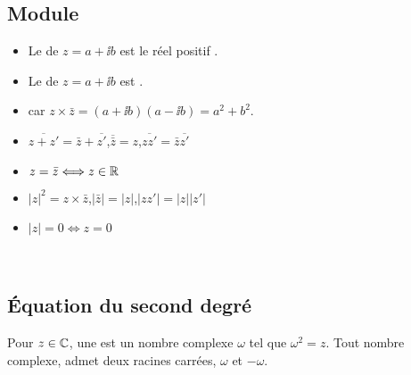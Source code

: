 \documentclass[10pt,class=article,crop=false]{standalone}
\begin{document}
\begin{multicols}{2}
\subsection{Module}


\begin{itemize}
	\item Le  de $z = a + \ii b$ est le réel positif .
	\item Le  de $z = a + \ii b$ est .
	\item {} car $z \times \bar z = (a+\ii b)(a-\ii b) = a^2+b^2$.
\end{itemize}


\begin{itemize}
	\item $\overline{z + z'} = \bar{z} + \overline{z'}$,\quad $\overline{\bar{z}} =
	z$,\quad $\overline{zz'} = \bar{z}  \overline{z'}$
	
	\item $z = \bar{z} \Longleftrightarrow z \in \mathbb{R}$
	
	\item $\left| z \right|^2 = z \times \bar{z}$,\quad $\left| \bar{z} \right| =
	\left| z \right|$,\quad $\left| zz' \right| = |z| |z'|$
	
	\item $\left| z \right| = 0 \Longleftrightarrow z = 0$
\end{itemize}

\begin{proposition}
	\ 
\end{proposition}


\subsection{\'Equation du second degré}

Pour $z \in \mathbb{C}$, une  est un nombre complexe $\omega$
tel que $\omega^2 = z$. Tout nombre complexe, admet deux racines carrées, $\omega$ et $-\omega$.


\end{multicols}
\end{document}
